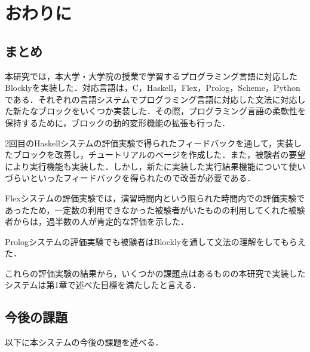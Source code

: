 \documentclass{risepaper}
\begin{document}
   \chapter{おわりに}
   
   \section{まとめ}
   
本研究では，本大学・大学院の授業で学習するプログラミング言語に対応したBlocklyを実装した．対応言語は，C，Haskell，Flex，Prolog，Scheme，Pythonである．それぞれの言語システムでプログラミング言語に対応した文法に対応した新たなブロックをいくつか実装した．その際，プログラミング言語の柔軟性を保持するために，ブロックの動的変形機能の拡張も行った．

2回目のHaskellシステムの評価実験で得られたフィードバックを通して，実装したブロックを改善し，チュートリアルのページを作成した．また，被験者の要望により実行機能も実装した．しかし，新たに実装した実行結果機能について使いづらいといったフィードバックを得られたので改善が必要である．

Flexシステムの評価実験では，演習時間内という限られた時間内での評価実験であったため，一定数の利用できなかった被験者がいたものの利用してくれた被験者からは，過半数の人が肯定的な評価を示した．

Prologシステムの評価実験でも被験者はBlocklyを通して文法の理解をしてもらえた．

これらの評価実験の結果から，いくつかの課題点はあるものの本研究で実装したシステムは第1章で述べた目標を満たしたと言える．

   \section{今後の課題}
   
以下に本システムの今後の課題を述べる．
   
\end{document}

